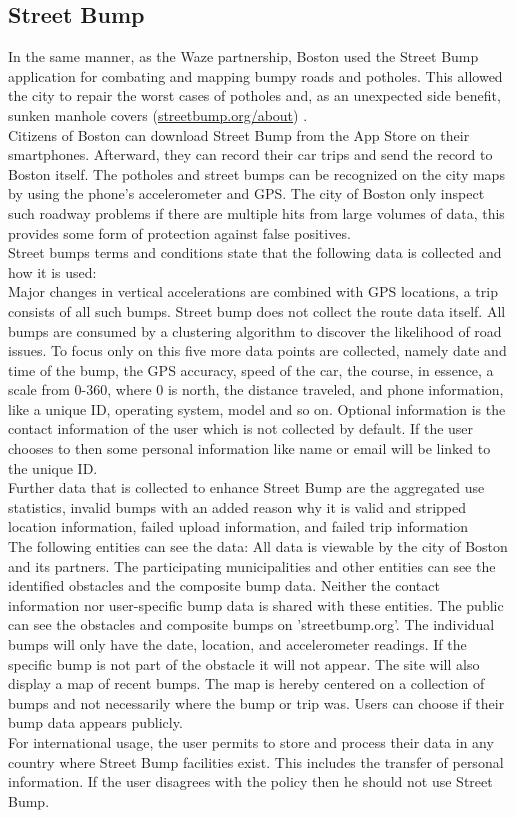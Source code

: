 \documentclass[a4paper,12pt]{report}
\begin{document}
		\subsection[Street Bump]{Street Bump \cite{EGG17}}
		\startsubsection
			In the same manner, as the Waze partnership, Boston used the Street Bump application for combating and mapping bumpy roads and potholes. This allowed the city to repair the worst cases of potholes and, as an unexpected side benefit, sunken manhole covers (\href{http://www.streetbump.org/about}{streetbump.org/about}) \cite{BostonStreetBumpTOS}. \\
			Citizens of Boston can download Street Bump from the App Store on their smartphones. Afterward, they can record their car trips and send the record to Boston itself. The potholes and street bumps can be recognized on the city maps by using the phone's accelerometer and GPS. The city of Boston only inspect such roadway problems if there are multiple hits from large volumes of data, this provides some form of protection against false positives.\\
			Street bumps terms and conditions state that the following data is collected and how it is used:\\
			Major changes in vertical accelerations are combined with GPS locations, a trip consists of all such bumps. Street bump does not collect the route data itself. 
			All bumps are consumed by a clustering algorithm to discover the likelihood of road issues. To focus only on this five more data points are collected, namely date and time of the bump, the GPS accuracy, speed of the car, the course, in essence, a scale from 0-360, where 0 is north, the distance traveled, and phone information, like a unique ID, operating system, model and so on.
			Optional information is the contact information of the user which is not collected by default. If the user chooses to then some personal information like name or email will be linked to the unique ID.\\
			Further data that is collected to enhance Street Bump are the aggregated use statistics, invalid bumps with an added reason why it is valid and stripped location information, failed upload information, and failed trip information\\
			The following entities can see the data:
			All data is viewable by the city of Boston and its partners. The participating municipalities and other entities can see the identified obstacles and the composite bump data.
			Neither the contact information nor user-specific bump data is shared with these entities.
			The public can see the obstacles and composite bumps on 'streetbump.org'. The individual bumps will only have the date, location, and accelerometer readings. If the specific bump is not part of the obstacle it will not appear.  The site will also display a map of recent bumps. The map is hereby centered on a collection of bumps and not necessarily where the bump or trip was. Users can choose if their bump data appears publicly.\\
			For international usage, the user permits to store and process their data in any country where Street Bump facilities exist. This includes the transfer of personal information. If the user disagrees with the policy then he should not use Street Bump.
		\closesection	
\end{document}
